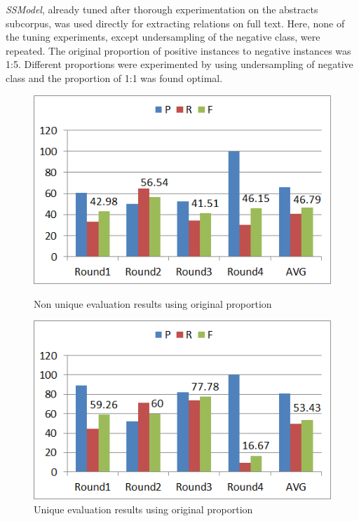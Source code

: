 \textit{SSModel}, already tuned after thorough experimentation on the abstracts subcorpus, was used directly for extracting relations on full text. Here, none of the tuning experiments, except undersampling \cite{akbani2004applying} of the negative class, were repeated. The original proportion of positive instances to negative instances was 1:5. Different proportions were experimented by using undersampling of negative class and the proportion of 1:1 was found optimal.

\begin{figure}
\centering
\begin{minipage}{.5\textwidth}
  \centering
  \includegraphics[width=.95\textwidth]{figures/3_FTOrigRatioResults.png}
  \caption{Non unique evaluation results using original proportion}
  \label{fig:FT_ResOrigNonUniq}
\end{minipage}%
\begin{minipage}{.5\textwidth}
  \centering
  \includegraphics[width=.95\textwidth]{figures/3_FTOrigRatioResults_Uniq.png}
  \caption{Unique evaluation results using original proportion}
  \label{fig:FT_ResOrigUniq}
\end{minipage}
\end{figure}

